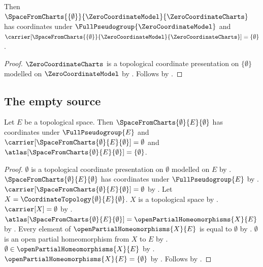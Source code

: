 \begin{theorem}\label{zero_coordinate_chart_space}
    Then $\SpaceFromCharts{\{\emptyset\}}{\ZeroCoordinateModel}{\ZeroCoordinateCharts}$
        has coordinates under $\FullPseudogroup{\ZeroCoordinateModel}$ and
        $\carrier[\SpaceFromCharts{\{\emptyset\}}{\ZeroCoordinateModel}{\ZeroCoordinateCharts}]
            =\{\emptyset\}$.
\end{theorem}
\begin{proof}
    $\ZeroCoordinateCharts$ is a topological coordinate presentation on
        $\{\emptyset\}$ modelled on $\ZeroCoordinateModel$ by
        .
    Follows by .
\end{proof}

\subsection{The empty source}

\begin{theorem}\label{empty_chart_space}
    Let $E$ be a topological space.
    Then $\SpaceFromCharts{\emptyset}{E}{\emptyset}$ has coordinates under
        $\FullPseudogroup{E}$ and
        $\carrier[\SpaceFromCharts{\emptyset}{E}{\emptyset}]=\emptyset$ and
        $\atlas[\SpaceFromCharts{\emptyset}{E}{\emptyset}]=\{\emptyset\}$.
\end{theorem}
\begin{proof}
    $\emptyset$ is a topological coordinate presentation on $\emptyset$ modelled on $E$
        by .
    $\SpaceFromCharts{\emptyset}{E}{\emptyset}$ has coordinates under
        $\FullPseudogroup{E}$ by .
    $\carrier[\SpaceFromCharts{\emptyset}{E}{\emptyset}]=\emptyset$ by
        .
    Let $X=\CoordinateTopology{\emptyset}{E}{\emptyset}$.
    $X$ is a topological space by .
    $\carrier[X]=\emptyset$ by .
    $\atlas[\SpaceFromCharts{\emptyset}{E}{\emptyset}]
        =\openPartialHomeomorphisms{X}{E}$ by .
    Every element of $\openPartialHomeomorphisms{X}{E}$ is equal to $\emptyset$ by
        .
    $\emptyset$ is an open partial homeomorphism from $X$ to $E$ by
        .
    $\emptyset\in\openPartialHomeomorphisms{X}{E}$ by
        .
    $\openPartialHomeomorphisms{X}{E}=\{\emptyset\}$ by .
    Follows by \auto.
\end{proof}
